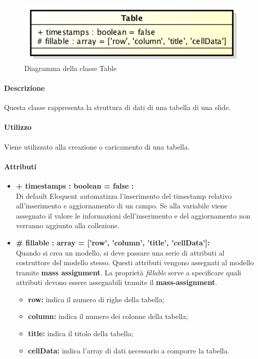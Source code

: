	\begin{figure}[h]
		\centering
		\includegraphics[width=0.5\linewidth]{img/back_end_premi_model_table}
		\caption[Diagramma della classe Table]{Diagramma della classe Table}
		\label{fig:back_end_premi_model_table}
	\end{figure}


	\paragraph{Descrizione}
	Questa classe rappresenta la struttura di dati di una tabella di una slide.
	
	\paragraph{Utilizzo}
	Viene utilizzato alla creazione o caricamento di una tabella.
	
	\paragraph{Attributi}
	\begin{itemize}
		\item \textbf{+ timestamps : boolean = false :}\\
		Di default Eloquent automatizza l'inserimento del timestamp relativo all'inserimento e aggiornamento di un campo. Se alla variabile viene assegnato il valore le informazioni dell'inserimento e del aggiornamento non verranno aggiunto alla collezione.
		\item \textbf{\# fillable : array = [’row’, ’column’, ’title’, ’cellData’]:}\\
		Quando si crea un modello, si deve passare una serie di attributi al costruttore del modello stesso. Questi attributi vengono assegnati al modello tramite \textbf{mass assignment}. La proprietà \textit{fillable} serve a specificare quali attributi devono essere assegnabili tramite il \textbf{mass-assignment}.
		\begin{itemize}
			\item \textbf{row:} indica il numero di righe della tabella;
			\item \textbf{column:} indica il numero dei colonne della tabella;
			\item \textbf{title:} indica il titolo della tabella;
			\item \textbf{cellData:} indica l'array di dati necessario a comporre la tabella.
		\end{itemize}
	\end{itemize}
